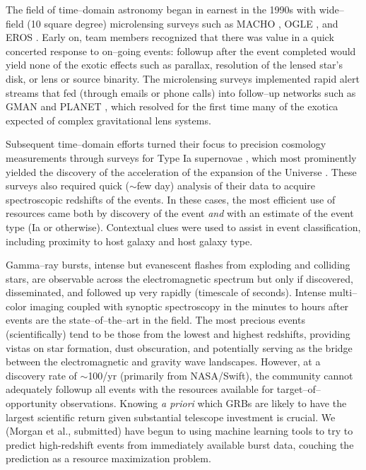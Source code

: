 \smallskip

The field of time--domain astronomy began in earnest in the 1990s with
wide--field (10 square degree) microlensing surveys such as MACHO
\citep{2000ApJ...542..281A}, OGLE \citep{1994AcA....44..227U}, and EROS
\citep{2003A&A...400..951A}.   Early on, team members recognized that there was
value in a quick concerted response to on--going events: followup after the
event completed would yield none of the exotic effects such as parallax,
resolution of the lensed star's disk, or lens or source binarity.  The
microlensing surveys implemented rapid alert streams that fed (through emails or
phone calls) into follow--up networks such as GMAN \citep{2000PhDT.......258B}
and PLANET \citep{1998ApJ...509..687A}, which resolved for the first time many
of the exotica expected of complex gravitational lens systems.

Subsequent time--domain efforts turned their focus to precision cosmology
measurements through surveys for Type Ia supernovae \citep{1996AJ....112.2398H},
which most prominently yielded the discovery of the acceleration of the
expansion of the Universe \citep{1998AJ....116.1009R,1999ApJ...517..565P}. These
surveys also required quick ($\sim$few day) analysis of their data to acquire
spectroscopic redshifts of the events. In these cases, the most efficient use of
resources came both by discovery of the event {\it and} with an estimate of the
event type (Ia or otherwise).  Contextual clues were used to assist in event
classification, including proximity to host galaxy and host galaxy type.

Gamma--ray bursts, intense but evanescent flashes from exploding and colliding
stars, are observable across the electromagnetic spectrum but only if
discovered, disseminated, and followed up very rapidly (timescale of seconds).
Intense multi--color imaging coupled with synoptic spectroscopy in the minutes
to hours after events are the state--of--the--art in the field. The most
precious events (scientifically) tend to be those from the lowest and highest
redshifts, providing vistas on star formation, dust obscuration, and potentially
serving as the bridge between the electromagnetic and gravity wave landscapes.
However, at a discovery rate of $\sim$100/yr (primarily from NASA/Swift), the
community cannot adequately followup all events with the resources available for
target--of--opportunity observations. Knowing {\it a priori} which GRBs are
likely to have the largest scientific return given substantial telescope
investment is crucial. We (Morgan et al., submitted) have begun to using machine
learning tools to try to predict high-redshift events from immediately available
burst data, couching the prediction as a resource maximization problem.

